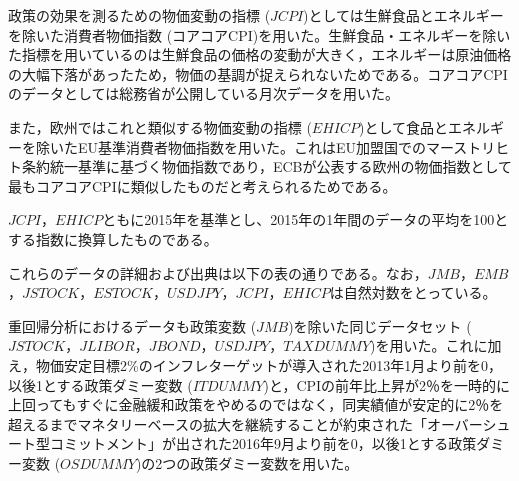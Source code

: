 \documentclass[12pt]{jarticle}
\begin{document}
{政策の効果を測るための物価変動の指標 ($JCPI$)としては生鮮食品とエネルギーを除いた消費者物価指数 (コアコアCPI)を用いた。生鮮食品・エネルギーを除いた指標を用いているのは生鮮食品の価格の変動が大きく，エネルギーは原油価格の大幅下落があったため，物価の基調が捉えられないためである。コアコアCPIのデータとしては総務省が公開している月次データを用いた。

また，欧州ではこれと類似する物価変動の指標 ($EHICP$)として食品とエネルギーを除いたEU基準消費者物価指数を用いた。これはEU加盟国でのマーストリヒト条約統一基準に基づく物価指数であり，ECBが公表する欧州の物価指数として最もコアコアCPIに類似したものだと考えられるためである。

$JCPI$，$EHICP$ともに2015年を基準とし、2015年の1年間のデータの平均を100とする指数に換算したものである。

これらのデータの詳細および出典は以下の表の通りである。なお，$JMB$，$EMB$，$JSTOCK$，$ESTOCK$，$USDJPY$，$JCPI$，$EHICP$は自然対数をとっている。


重回帰分析におけるデータも政策変数 ($JMB$)を除いた同じデータセット ($JSTOCK$，$JLIBOR$，$JBOND$，$USDJPY$，$TAXDUMMY$)を用いた。これに加え，物価安定目標2\%のインフレターゲットが導入された2013年1月より前を0，以後1とする政策ダミー変数 ($ITDUMMY$)と，CPIの前年比上昇が2％を一時的に上回ってもすぐに金融緩和政策をやめるのではなく，同実績値が安定的に2％を超えるまでマネタリーベースの拡大を継続することが約束された「オーバーシュート型コミットメント」が出された2016年9月より前を0，以後1とする政策ダミー変数 ($OSDUMMY$)の2つの政策ダミー変数を用いた。

}
\end{document}
